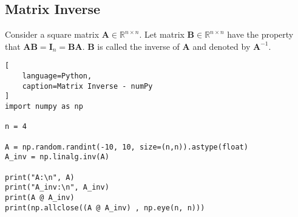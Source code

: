 \subsection{Matrix Inverse \cite{mfml/book/mml/Deisenroth-Faisal-Ong}}

Consider a square matrix $\bm{A} \in \mathbb{R}^{n\times n}$. 
Let matrix $\bm{B} \in \mathbb{R}^{n\times n}$ have the property that $\bm{A}\bm{B} = \bm{I}_n = \bm{B}\bm{A}$. 
$\bm{B}$ is called the inverse of $\bm{A}$ and denoted by $\bm{A}^{-1}$.
\hfill \cite{mfml/book/mml/Deisenroth-Faisal-Ong}





\begin{lstlisting}[
    language=Python,
    caption=Matrix Inverse - numPy
]
import numpy as np

n = 4

A = np.random.randint(-10, 10, size=(n,n)).astype(float)
A_inv = np.linalg.inv(A)

print("A:\n", A)
print("A_inv:\n", A_inv)
print(A @ A_inv)
print(np.allclose((A @ A_inv) , np.eye(n, n)))
\end{lstlisting}






